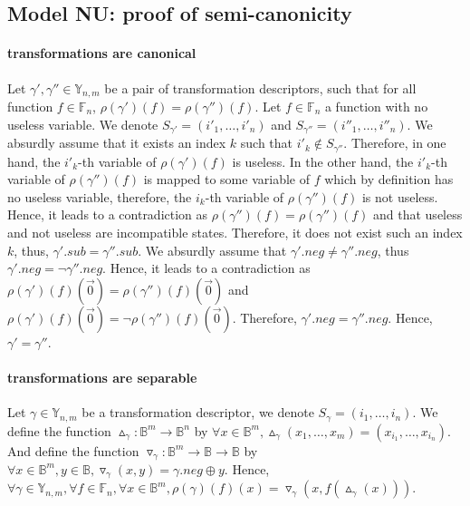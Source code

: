 \documentclass[a4paper,10pt]{article}
\newcommand{\B}{\mathbb{B}}
\newcommand{\F}{\mathbb{F}}
\newcommand{\Y}{\mathbb{Y}}
\begin{document}
\subsection{Model NU: proof of semi-canonicity\label{grobdd-model-nu}}

\paragraph{transformations are canonical\\}
Let $\gamma', \gamma''\in\Y_{n, m}$ be a pair of transformation descriptors, such that for all function $f\in\F_n$, $\rho(\gamma')(f) = \rho(\gamma'')(f)$.
Let $f\in\F_n$ a function with no useless variable.
We denote $S_{\gamma'} = (i'_1, \dots, i'_n)$ and $S_{\gamma''} = (i''_1, \dots, i''_n)$.
We absurdly assume that it exists an index $k$ such that $i'_k \not\in S_{\gamma''}$.
Therefore, in one hand, the $i'_k$-th variable of $\rho(\gamma')(f)$ is useless.
In the other hand, the $i'_k$-th variable of $\rho(\gamma'')(f)$ is mapped to some variable of $f$ which by definition has no useless variable, therefore, the $i_k$-th variable of $\rho(\gamma'')(f)$ is not useless.
Hence, it leads to a contradiction as $\rho(\gamma'')(f) = \rho(\gamma'')(f)$ and that useless and not useless are incompatible states.
Therefore, it does not exist such an index $k$, thus, $\gamma'.sub = \gamma''.sub$.
We absurdly assume that $\gamma'.neg \neq \gamma''.neg$, thus $\gamma'.neg = \lnot \gamma''.neg$.
Hence, it leads to a contradiction as $\rho(\gamma')(f)(\vec{0}) = \rho(\gamma'')(f)(\vec{0})$ and $\rho(\gamma')(f)(\vec{0}) = \lnot \rho(\gamma'')(f)(\vec{0})$.
Therefore, $\gamma'.neg = \gamma''.neg$.
Hence, $\gamma' = \gamma''$.

\paragraph{transformations are separable\\}
Let $\gamma\in\Y_{n, m}$ be a transformation descriptor, we denote $S_{\gamma} = (i_1, \dots, i_n)$.
We define the function $\vartriangle_\gamma : \B^m \longrightarrow \B^n$ by $\forall x\in\B^m, \vartriangle_\gamma(x_1, \dots, x_m) = (x_{i_1}, \dots, x_{i_n})$.
And define the function $\triangledown_\gamma : \B^m \longrightarrow \B \longrightarrow \B$ by $\forall x\in\B^m, y\in\B, \triangledown_\gamma(x, y) = \gamma.neg \oplus y$.
Hence, $\forall \gamma\in\Y_{n, m},\forall f\in\F_n, \forall x\in\B^m, \rho(\gamma)(f)(x) = \triangledown_\gamma(x, f(\vartriangle_\gamma(x)))$.
\end{document}
